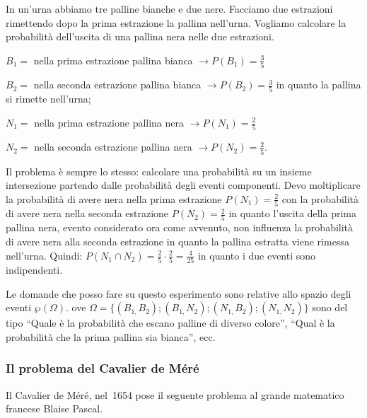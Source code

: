 \begin{esempio}
In un'urna abbiamo tre palline bianche e due nere. Facciamo due estrazioni 
rimettendo dopo la prima estrazione la pallina nell'urna. Vogliamo 
calcolare la 
probabilità dell'uscita di una pallina nera nelle due estrazioni.
\begin{itemize*}
\item $ B_{1}= $ nella prima estrazione pallina bianca $\to P(B_1)=\frac 3 
5$
\item $ B_{2}= $ nella seconda estrazione pallina bianca $\to P(B_2)=\frac 
3 5$ 
in quanto la pallina si rimette nell'urna;
\item $ N_{1}= $ nella prima estrazione pallina nera $\to P(N_1)=\frac 2 5$
\item $ N_{2}= $ nella seconda estrazione pallina nera $\to P(N_2)=\frac 2 
5$.
\end{itemize*}
Il problema è sempre lo stesso: calcolare una probabilità su un insieme 
intersezione partendo dalle probabilità degli eventi componenti. Devo 
moltiplicare la probabilità di avere nera nella prima estrazione 
$P(N_1)=\frac 
2 
5$ con la probabilità di avere nera nella seconda estrazione $P(N_2)=\frac 
2 5$ 
in quanto l'uscita della prima pallina nera, evento considerato ora come 
avvenuto, non influenza la probabilità di avere nera alla seconda 
estrazione in 
quanto la pallina estratta viene rimessa nell'urna. Quindi: $P(N_1\cap 
N_2)=\frac 2 5\cdot \frac 2 5=\frac 4{25}$ in quanto i due eventi sono 
indipendenti.
\begin{center}
 
\end{center}
Le domande che posso fare su questo esperimento sono relative allo spazio 
degli 
eventi $\wp (\Omega ).$ ove $\Omega 
=\{(B_{1,}B_2);(B_{1,}N_2);(N_{1,}B_2);(N_{1,}N_2)\}$ sono del tipo ``Quale 
è 
la 
probabilità che escano palline di diverso colore'', ``Qual è la probabilità 
che 
la prima pallina sia bianca'', ecc.
\end{esempio}

\subsubsection*{Il problema del Cavalier de Méré}

Il Cavalier de Méré, nel~1654 pose il seguente problema al grande matematico 
francese Blaise Pascal.

